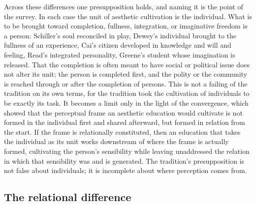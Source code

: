 Across these differences one presupposition holds, and naming it is the point of the survey. In each case the unit of aesthetic cultivation is the individual. What is to be brought toward completion, fullness, integration, or imaginative freedom is a person: Schiller's soul reconciled in play, Dewey's individual brought to the fullness of an experience, Cai's citizen developed in knowledge and will and feeling, Read's integrated personality, Greene's student whose imagination is released. That the completion is often meant to have social or political issue does not alter its unit; the person is completed first, and the polity or the community is reached through or after the completion of persons. This is not a failing of the tradition on its own terms, for the tradition took the cultivation of individuals to be exactly its task. It becomes a limit only in the light of the convergence, which showed that the perceptual frame an aesthetic education would cultivate is not formed in the individual first and shared afterward, but formed in relation from the start. If the frame is relationally constituted, then an education that takes the individual as its unit works downstream of where the frame is actually formed, cultivating the person's sensibility while leaving unaddressed the relation in which that sensibility was and is generated. The tradition's presupposition is not false about individuals; it is incomplete about where perception comes from.

\subsection{The relational difference}
\label{p23:sub:edu-difference}

